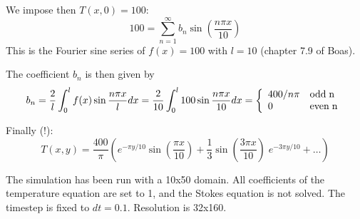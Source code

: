 We impose then $T(x,0)=100$:
\[
100 = \sum_{n=1}^\infty b_n \sin (\frac{n\pi x}{10}) 
\]
This is the Fourier sine series of $f(x)=100$ with $l=10$ (chapter 7.9 of Boas).

The coefficient $b_n$ is then given by
\[
b_n=\frac{2}{l} \int_0^l f(x) \sin\frac{n \pi x}{l} dx
=\frac{2}{10} \int_0^l 100 \sin\frac{n \pi x}{10} dx
=
\left\{
\begin{array}{ll}
400/n\pi & {\rm odd \; n} \\
0 & {\rm even \; n} \\
\end{array}
\right.
\]

Finally (!):
\[
T(x,y) = 
\frac{400}{\pi}
\left(
e^{-\pi y/10} \sin (\frac{\pi x}{10})
+\frac{1}{3}
\sin (\frac{3\pi x}{10}) \;   e^{-3\pi y/10}
+ \dots
\right)
\]

The simulation has been run with a 10x50 domain. All coefficients of the temperature equation are
set to 1, and the Stokes equation is not solved. The timestep is fixed to $dt=0.1$. Resolution 
is 32x160. 

